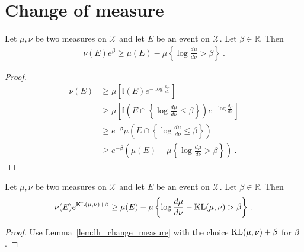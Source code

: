 \section{Change of measure}

\begin{lemma}
  \label{lem:llr_change_measure}
  Let $\mu, \nu$ be two measures on $\mathcal X$ and let $E$ be an event on $\mathcal X$. Let $\beta \in \mathbb{R}$. Then
  \begin{align*}
  \nu(E) e^{\beta} \ge \mu(E) - \mu\left\{ \log\frac{d \mu}{d \nu} > \beta \right\} \: .
  \end{align*}
\end{lemma}

\begin{proof}
\begin{align*}
\nu(E)
&\ge \mu\left[\mathbb{I}(E) e^{- \log\frac{d \mu}{d \nu} }\right]
\\
&\ge \mu\left[\mathbb{I}\left(E \cap \left\{\log\frac{d \mu}{d \nu} \le \beta\right\}\right) e^{- \log\frac{d \mu}{d \nu} }\right]
\\
&\ge e^{- \beta}\mu\left(E \cap \left\{\log\frac{d \mu}{d \nu} \le \beta\right\}\right)
\\
&\ge e^{- \beta}\left( \mu(E) - \mu\left\{ \log\frac{d \mu}{d \nu} > \beta \right\} \right)
\: .
\end{align*}
\end{proof}

\begin{corollary}
  \label{cor:kl_change_measure}
  Let $\mu, \nu$ be two measures on $\mathcal X$ and let $E$ be an event on $\mathcal X$. Let $\beta \in \mathbb{R}$. Then
  \begin{align*}
  \nu(E) e^{\mathrm{KL}(\mu, \nu) + \beta} \ge \mu(E) - \mu\left\{ \log\frac{d \mu}{d \nu} - \mathrm{KL}(\mu, \nu) > \beta \right\} \: .
  \end{align*}
\end{corollary}

\begin{proof}
Use Lemma~\ref{lem:llr_change_measure} with the choice $\mathrm{KL}(\mu, \nu) + \beta$ for $\beta$.
\end{proof}

